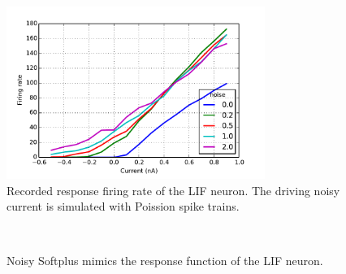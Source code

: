\documentclass[runningheads,a4paper]{llncs}
\begin{document}
\begin{figure}[bt!]
	\centering
	\includegraphics[width=0.75\textwidth]{pic/3.pdf}
	\caption{
	Recorded response firing rate of the LIF neuron.
	The driving noisy current is simulated with Poission spike trains.}
	\label{fig:lif_pois}	
\end{figure}


\begin{figure}[bt!]
	\centering
	\\
	\caption{
	Noisy Softplus mimics the response function of the LIF neuron.}
\end{figure}
\end{document}
